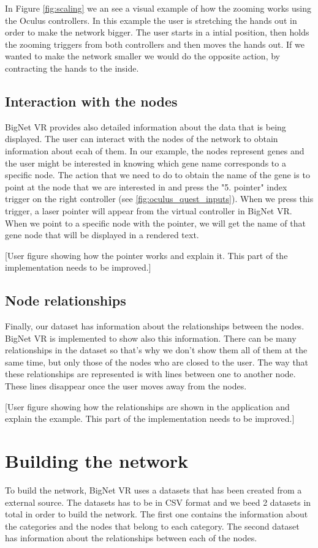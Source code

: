 In Figure \ref{fig:scaling} we an see a visual example of how the zooming works using the Oculus controllers. In this example the user is stretching the hands out in order to make the network bigger. The user starts in a intial position, then holds the zooming triggers from both controllers and then moves the hands out. If we wanted to make the network smaller we would do the opposite action, by contracting the hands to the inside.

\subsection{Interaction with the nodes}
BigNet VR provides also detailed information about the data that is being displayed. The user can interact with the nodes of the network to obtain information about ecah of them. In our example, the nodes represent genes and the user might be interested in knowing which gene name corresponds to a specific node. The action that we need to do to obtain the name of the gene is to point at the node that we are interested in and press the "5. pointer" index trigger on the right controller (see \ref{fig:oculus_quest_inputs}). When we press this trigger, a laser pointer will appear from the virtual controller in BigNet VR. When we point to a specific node with the pointer, we will get the name of that gene node that will be displayed in a rendered text.

[User figure showing how the pointer works and explain it. This part of the implementation needs to be improved.]

\subsection{Node relationships}
Finally, our dataset has information about the relationships between the nodes. BigNet VR is implemented to show also this information. There can be many relationships in the dataset so that's why we don't show them all of them at the same time, but only those of the nodes who are closed to the user. The way that these relationships are represented is with lines between one to another node. These lines disappear once the user moves away from the nodes.

[User figure showing how the relationships are shown in the application and explain the example. This part of the implementation needs to be improved.]


\section{Building the network}
To build the network, BigNet VR uses a datasets that has been created from a external source. The datasets has to be in CSV format and we beed 2 datasets in total in order to build the network. The first one contains the information about the categories and the nodes that belong to each category. The second dataset has information about the relationships between each of the nodes.

